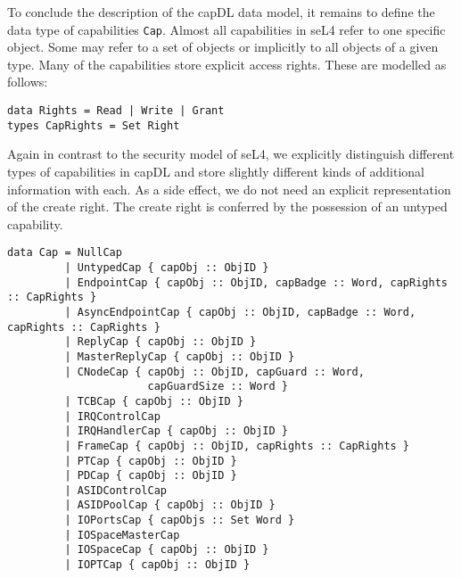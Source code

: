 \documentclass[a4paper,11pt]{article}
\begin{document}
To conclude the description of the capDL data model, it remains to define the data type of capabilities \texttt{Cap}. Almost all capabilities in seL4 refer to one specific object. Some may refer to a set of objects or implicitly to all objects of a given type. Many of the capabilities store explicit access rights. These are modelled as follows:

\begin{verbatim}
data Rights = Read | Write | Grant
types CapRights = Set Right
\end{verbatim}

Again in contrast to the security model of seL4, we explicitly distinguish different types of capabilities in capDL and store slightly different kinds of additional information with each. As a side effect, we do not need an explicit representation of the create right. The create right is conferred by the possession of an untyped capability.

{\small
\begin{verbatim}
data Cap = NullCap
         | UntypedCap { capObj :: ObjID } 
         | EndpointCap { capObj :: ObjID, capBadge :: Word, capRights :: CapRights }
         | AsyncEndpointCap { capObj :: ObjID, capBadge :: Word, capRights :: CapRights }
         | ReplyCap { capObj :: ObjID }
         | MasterReplyCap { capObj :: ObjID }
         | CNodeCap { capObj :: ObjID, capGuard :: Word, 
                      capGuardSize :: Word }
         | TCBCap { capObj :: ObjID }
         | IRQControlCap 
         | IRQHandlerCap { capObj :: ObjID }
         | FrameCap { capObj :: ObjID, capRights :: CapRights } 
         | PTCap { capObj :: ObjID } 
         | PDCap { capObj :: ObjID }
         | ASIDControlCap 
         | ASIDPoolCap { capObj :: ObjID }
         | IOPortsCap { capObjs :: Set Word }
         | IOSpaceMasterCap 
         | IOSpaceCap { capObj :: ObjID }
         | IOPTCap { capObj :: ObjID }
\end{verbatim}}
\end{document}
